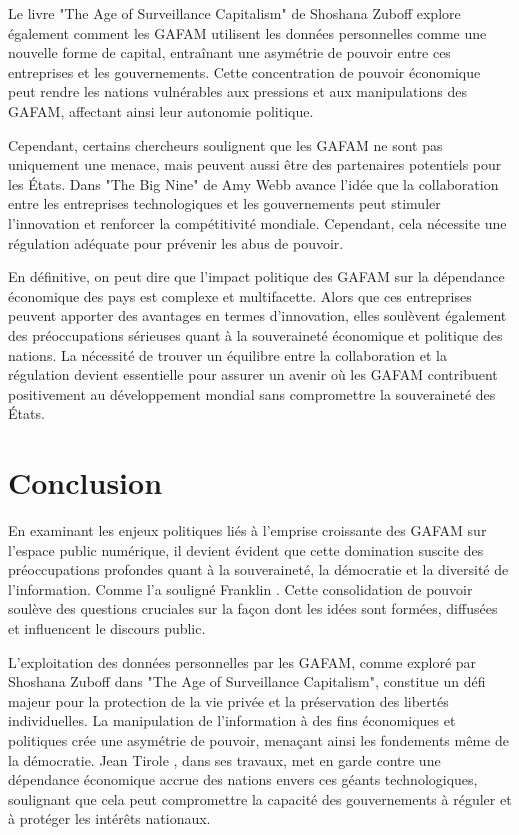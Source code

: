 \documentclass[12pt,a4paper]{article} %
\begin{document}
	 Le livre "The Age of Surveillance Capitalism" de Shoshana Zuboff \cite{Zuboff2020} explore également comment les GAFAM utilisent les données personnelles comme une nouvelle forme de capital, entraînant une asymétrie de pouvoir entre ces entreprises et les gouvernements. Cette concentration de pouvoir économique peut rendre les nations vulnérables aux pressions et aux manipulations des GAFAM, affectant ainsi leur autonomie politique.
	 
	 Cependant, certains chercheurs soulignent que les GAFAM ne sont pas uniquement une menace, mais peuvent aussi être des partenaires potentiels pour les États. Dans "The Big Nine" de Amy Webb \cite{Webb2019} avance l'idée que la collaboration entre les entreprises technologiques et les gouvernements peut stimuler l'innovation et renforcer la compétitivité mondiale. Cependant, cela nécessite une régulation adéquate pour prévenir les abus de pouvoir.
	 
	 En définitive, on peut dire que l'impact politique des GAFAM sur la dépendance économique des pays est complexe et multifacette. Alors que ces entreprises peuvent apporter des avantages en termes d'innovation, elles soulèvent également des préoccupations sérieuses quant à la souveraineté économique et politique des nations. La nécessité de trouver un équilibre entre la collaboration et la régulation devient essentielle pour assurer un avenir où les GAFAM contribuent positivement au développement mondial sans compromettre la souveraineté des États.
	 
	
	\section{Conclusion}
     En examinant les enjeux politiques liés à l'emprise croissante des GAFAM sur l'espace public numérique, il devient évident que cette domination suscite des préoccupations profondes quant à la souveraineté, la démocratie et la diversité de l'information. Comme l'a souligné Franklin \cite ["les géants technologiques sont en train de devenir les gardiens de la pensée contemporaine"]{Foer2018} . Cette consolidation de pouvoir soulève des questions cruciales sur la façon dont les idées sont formées, diffusées et influencent le discours public. 
     
     L'exploitation des données personnelles par les GAFAM, comme exploré par Shoshana Zuboff dans "The Age of Surveillance Capitalism", constitue un défi majeur pour la protection de la vie privée et la préservation des libertés individuelles. La manipulation de l'information à des fins économiques et politiques crée une asymétrie de pouvoir, menaçant ainsi les fondements même de la démocratie. Jean Tirole \cite{Tirole2014}, dans ses travaux, met en garde contre une dépendance économique accrue des nations envers ces géants technologiques, soulignant que cela peut compromettre la capacité des gouvernements à réguler et à protéger les intérêts nationaux.
     
\end{document}
